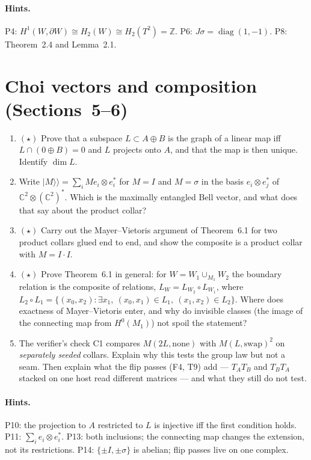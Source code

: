 \documentclass[11pt]{article}
\newcommand{\Z}{\mathbb{Z}}
\newcommand{\C}{\mathbb{C}}
\begin{document}
\paragraph{Hints.} P4: $H^1(W,\partial W)\cong H_2(W)\cong H_2(T^2) = \Z$. P6: $J\sigma = \operatorname{diag}(1,-1)$. P8: Theorem~2.4 and Lemma~2.1.

\section{Choi vectors and composition (Sections~5--6)}

\begin{enumerate}[label=\textbf{P\arabic*.},leftmargin=*,start=10]
\item $(\star)$ Prove that a subspace $L\subset A\oplus B$ is the graph of a
  linear map iff $L\cap(0\oplus B) = 0$ and $L$ projects onto $A$, and that
  the map is then unique. Identify $\dim L$.
\item Write $|M\rangle\!\rangle = \sum_i Me_i\otimes e_i^*$ for $M = I$ and
  $M = \sigma$ in the basis $e_i\otimes e_j^*$ of $\C^2\otimes(\C^2)^*$. Which is the
  maximally entangled Bell vector, and what does that say about the product collar?
\item $(\star)$ Carry out the Mayer--Vietoris argument of
  Theorem~6.1 for two product collars glued end to end, and
  show the composite is a product collar with $M = I\cdot I$.
\item $(\star)$ Prove Theorem~6.1 in general: for $W = W_1\cup_{M_1}W_2$ the
  boundary relation is the composite of relations, $L_W = L_{W_2}\circ L_{W_1}$,
  where $L_2\circ L_1 = \{(x_0,x_2):\exists x_1,\ (x_0,x_1)\in L_1,\ (x_1,x_2)\in L_2\}$.
  Where does exactness of Mayer--Vietoris enter, and why do invisible classes
  (the image of the connecting map from $H^0(M_1)$) not spoil the statement?
\item The verifier's check C1 compares $M(2L,\text{none})$ with
  $M(L,\text{swap})^2$ on \emph{separately seeded} collars. Explain why this
  tests the group law but not a seam. Then explain what the flip passes (F4,
  T9) add --- $T_AT_B$ and $T_BT_A$ stacked on one host read different
  matrices --- and what they still do not test.
\end{enumerate}

\paragraph{Hints.} P10: the projection to $A$ restricted to $L$ is injective iff the first condition holds. P11: $\sum_i e_i\otimes e_i^*$. P13: both inclusions; the connecting map changes the extension, not its restrictions. P14: $\{\pm I,\pm\sigma\}$ is abelian; flip passes live on one complex.
\end{document}
